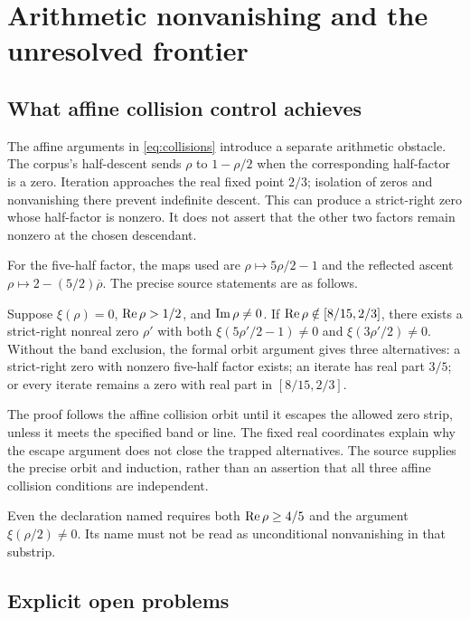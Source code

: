 \section{Arithmetic nonvanishing and the unresolved frontier}

\subsection{What affine collision control achieves}

The affine arguments in \eqref{eq:collisions} introduce a separate arithmetic obstacle. The corpus's half-descent sends \(\rho\) to \(1-\rho/2\) when the corresponding half-factor is a zero. Iteration approaches the real fixed point \(2/3\); isolation of zeros and nonvanishing there prevent indefinite descent. This can produce a strict-right zero whose half-factor is nonzero. It does not assert that the other two factors remain nonzero at the chosen descendant.

For the five-half factor, the maps used are \(\rho\mapsto5\rho/2-1\) and the reflected ascent \(\rho\mapsto2-(5/2)\overline\rho\). The precise source statements are as follows.

\begin{proposition}
Suppose \(\xi(\rho)=0\), \(\operatorname{Re}\rho>1/2\), and \(\operatorname{Im}\rho\ne0\). If \(\operatorname{Re}\rho\notin[8/15,2/3]\), there exists a strict-right nonreal zero \(\rho'\) with both
\(\xi(5\rho'/2-1)\ne0\) and \(\xi(3\rho'/2)\ne0\).
Without the band exclusion, the formal orbit argument gives three alternatives: a strict-right zero with nonzero five-half factor exists; an iterate has real part \(3/5\); or every iterate remains a zero with real part in \([8/15,2/3]\).
\end{proposition}
The proof follows the affine collision orbit until it escapes the allowed zero strip, unless it meets the specified band or line. The fixed real coordinates explain why the escape argument does not close the trapped alternatives. The source supplies the precise orbit and induction, rather than an assertion that all three affine collision conditions are independent.

Even the declaration named  requires both \(\operatorname{Re}\rho\ge4/5\) and the argument \(\xi(\rho/2)\ne0\). Its name must not be read as unconditional nonvanishing in that substrip.

\subsection{Explicit open problems}

